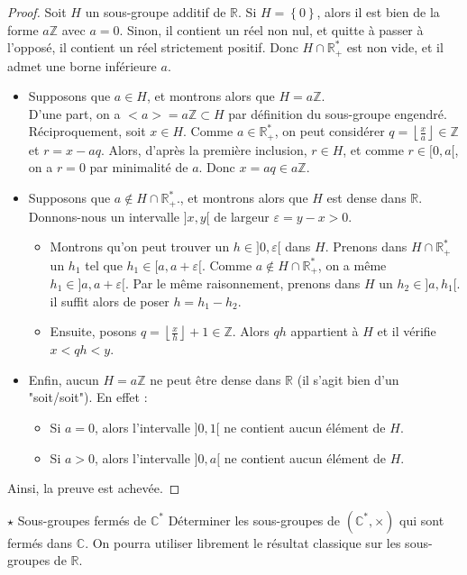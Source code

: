 \documentclass[french,a4paper]{article}
\newcommand{\Z}{\mathbb{Z}}
\newcommand{\R}{\mathbb{R}}
\newcommand{\C}{\mathbb{C}}
\newcommand{\st}{^*}
\theoremstyle{plain}
\theoremstyle{definition}
\theoremstyle{remark}
\begin{document}
\begin{proof}
	Soit $H$ un sous-groupe additif de $\R$. Si $H=\left\{0\right\}$, alors il est bien de la forme $a\Z$ avec $a=0$. Sinon, il contient un réel non nul, et quitte à passer à l'opposé, il contient un réel strictement positif. Donc $H\cap\R_+\st$ est non vide, et il admet une borne inférieure $a$.
	\begin{itemize}
		\item Supposons que $a\in H$, et montrons alors que $H=a\Z$. \\ D'une part, on a $<a>=a\Z\subset H$ par définition du sous-groupe engendré. Réciproquement, soit $x\in H$. Comme $a\in\R_+\st$, on peut considérer $q=\displaystyle\left\lfloor\frac{x}{a}\right\rfloor\in\Z$ et $r=x-aq$. Alors, d'après la première inclusion, $r\in H$, et comme $r\in[0,a[$, on a $r=0$ par minimalité de $a$. Donc $x=aq\in a\Z$.
		\item Supposons que $a\notin H\cap\R_+\st$., et montrons alors que $H$ est dense dans $\R$. \\ Donnons-nous un intervalle $]x,y[$ de largeur $\varepsilon=y-x>0$.
		\begin{itemize}
			\item Montrons qu'on peut trouver un $h\in]0,\varepsilon[$ dans $H$. Prenons dans $H\cap\R_+\st$ un $h_1$ tel que $h_1\in[a,a+\varepsilon[$. Comme $a\notin H\cap\R_+\st$, on a même $h_1\in]a,a+\varepsilon[$. Par le même raisonnement, prenons dans $H$ un $h_2\in]a,h_1[$. il suffit alors de poser $h=h_1-h_2$.
			\item Ensuite, posons $q=\displaystyle\left\lfloor\frac{x}{h}\right\rfloor+1\in\Z$. Alors $qh$ appartient à $H$ et il vérifie $x<qh<y$.
		\end{itemize}
		\item Enfin, aucun $H=a\Z$ ne peut être dense dans $\R$ (il s'agit bien d'un "soit/soit"). En effet :
		\begin{itemize}
			\item Si $a=0$, alors l'intervalle $]0,1[$ ne contient aucun élément de $H$.
			\item Si $a>0$, alors l'intervalle $]0,a[$ ne contient aucun élément de $H$.
		\end{itemize}
	\end{itemize}
	Ainsi, la preuve est achevée.
\end{proof}

\begin{ex}[Moulin.AG.10]{$\star$ Sous-groupes fermés de $\C\st$}
	Déterminer les sous-groupes de $(\C\st,\times)$ qui sont fermés dans $\C$. On pourra utiliser librement le résultat classique sur les sous-groupes de $\R$.
\end{ex}
\end{document}
